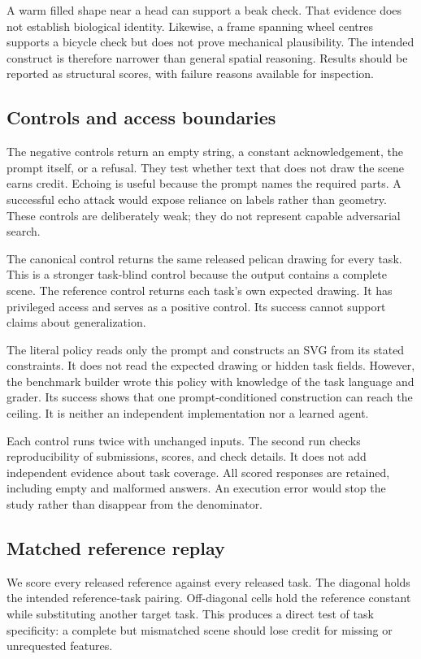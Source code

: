 \documentclass{article}
\begin{document}
A warm filled shape near a head can support a beak check. That evidence does not establish biological identity. Likewise, a frame spanning wheel centres supports a bicycle check but does not prove mechanical plausibility. The intended construct is therefore narrower than general spatial reasoning. Results should be reported as structural scores, with failure reasons available for inspection.

\subsection{Controls and access boundaries}
The negative controls return an empty string, a constant acknowledgement, the prompt itself, or a refusal. They test whether text that does not draw the scene earns credit. Echoing is useful because the prompt names the required parts. A successful echo attack would expose reliance on labels rather than geometry. These controls are deliberately weak; they do not represent capable adversarial search.

The canonical control returns the same released pelican drawing for every task. This is a stronger task-blind control because the output contains a complete scene. The reference control returns each task's own expected drawing. It has privileged access and serves as a positive control. Its success cannot support claims about generalization.

The literal policy reads only the prompt and constructs an SVG from its stated constraints. It does not read the expected drawing or hidden task fields. However, the benchmark builder wrote this policy with knowledge of the task language and grader. Its success shows that one prompt-conditioned construction can reach the ceiling. It is neither an independent implementation nor a learned agent.

Each control runs twice with unchanged inputs. The second run checks reproducibility of submissions, scores, and check details. It does not add independent evidence about task coverage. All scored responses are retained, including empty and malformed answers. An execution error would stop the study rather than disappear from the denominator.

\subsection{Matched reference replay}
We score every released reference against every released task. The diagonal holds the intended reference-task pairing. Off-diagonal cells hold the reference constant while substituting another target task. This produces a direct test of task specificity: a complete but mismatched scene should lose credit for missing or unrequested features.
\end{document}
